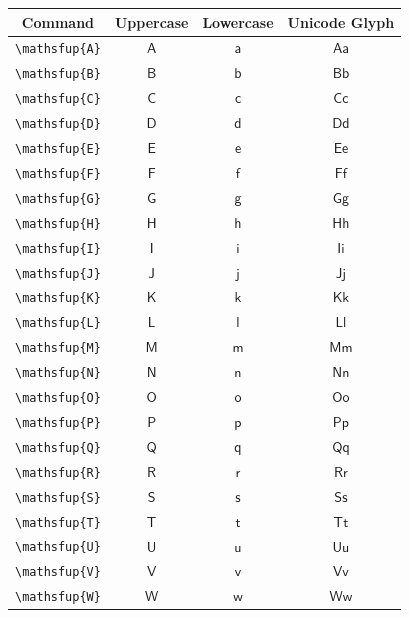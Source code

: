 \documentclass[12pt,a4paper]{article}
\begin{document}
\begin{longtable}{|c|c|c|c|}
\hline
\textbf{Command} & \textbf{Uppercase} & \textbf{Lowercase} & \textbf{Unicode Glyph} \\
\hline
\verb|\mathsfup{A}| & $\mathsfup{A}$ & $\mathsfup{a}$ & $ 𝖠 𝖺 $ \\
\verb|\mathsfup{B}| & $\mathsfup{B}$ & $\mathsfup{b}$ & $ 𝖡 𝖻 $ \\
\verb|\mathsfup{C}| & $\mathsfup{C}$ & $\mathsfup{c}$ & $ 𝖢 𝖼 $ \\
\verb|\mathsfup{D}| & $\mathsfup{D}$ & $\mathsfup{d}$ & $ 𝖣 𝖽 $ \\
\verb|\mathsfup{E}| & $\mathsfup{E}$ & $\mathsfup{e}$ & $ 𝖤 𝖾 $ \\
\verb|\mathsfup{F}| & $\mathsfup{F}$ & $\mathsfup{f}$ & $ 𝖥 𝖿 $ \\
\verb|\mathsfup{G}| & $\mathsfup{G}$ & $\mathsfup{g}$ & $ 𝖦 𝗀 $ \\
\verb|\mathsfup{H}| & $\mathsfup{H}$ & $\mathsfup{h}$ & $ 𝖧 𝗁 $ \\
\verb|\mathsfup{I}| & $\mathsfup{I}$ & $\mathsfup{i}$ & $ 𝖨 𝗂 $ \\
\verb|\mathsfup{J}| & $\mathsfup{J}$ & $\mathsfup{j}$ & $ 𝖩 𝗃 $ \\
\verb|\mathsfup{K}| & $\mathsfup{K}$ & $\mathsfup{k}$ & $ 𝖪 𝗄 $ \\
\verb|\mathsfup{L}| & $\mathsfup{L}$ & $\mathsfup{l}$ & $ 𝖫 𝗅 $ \\
\verb|\mathsfup{M}| & $\mathsfup{M}$ & $\mathsfup{m}$ & $ 𝖬 𝗆 $ \\
\verb|\mathsfup{N}| & $\mathsfup{N}$ & $\mathsfup{n}$ & $ 𝖭 𝗇 $ \\
\verb|\mathsfup{O}| & $\mathsfup{O}$ & $\mathsfup{o}$ & $ 𝖮 𝗈 $ \\
\verb|\mathsfup{P}| & $\mathsfup{P}$ & $\mathsfup{p}$ & $ 𝖯 𝗉 $ \\
\verb|\mathsfup{Q}| & $\mathsfup{Q}$ & $\mathsfup{q}$ & $ 𝖰 𝗊 $ \\
\verb|\mathsfup{R}| & $\mathsfup{R}$ & $\mathsfup{r}$ & $ 𝖱 𝗋 $ \\
\verb|\mathsfup{S}| & $\mathsfup{S}$ & $\mathsfup{s}$ & $ 𝖲 𝗌 $ \\
\verb|\mathsfup{T}| & $\mathsfup{T}$ & $\mathsfup{t}$ & $ 𝖳 𝗍 $ \\
\verb|\mathsfup{U}| & $\mathsfup{U}$ & $\mathsfup{u}$ & $ 𝖴 𝗎 $ \\
\verb|\mathsfup{V}| & $\mathsfup{V}$ & $\mathsfup{v}$ & $ 𝖵 𝗏 $ \\
\verb|\mathsfup{W}| & $\mathsfup{W}$ & $\mathsfup{w}$ & $ 𝖶 𝗐 $ \\

\end{longtable}
\end{document}
